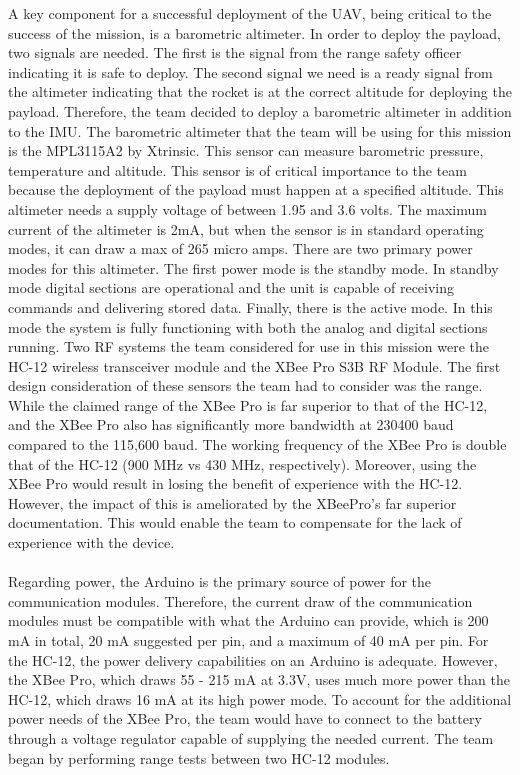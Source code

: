 A key component for a successful deployment of the UAV, being critical to the success of the mission, is a barometric altimeter. In order to deploy the payload, two signals are needed. The first is the signal from the range safety officer indicating it is safe to deploy. The second signal we need is a ready signal from the altimeter indicating that the rocket is at the correct altitude for deploying the payload. Therefore, the team decided to deploy a barometric altimeter in addition to the IMU. 
	The barometric altimeter that the team will be using for this mission is the MPL3115A2  by Xtrinsic. This sensor can measure barometric pressure, temperature and altitude. This sensor is of critical importance to the team because the deployment of the payload must happen at a specified altitude. This altimeter needs a supply voltage of between 1.95 and 3.6 volts. The maximum current of the altimeter is 2mA, but  when the sensor is in standard operating modes, it can draw a max of 265 micro amps. There are two primary power modes for this altimeter. The first power mode is the standby mode. In standby mode digital sections are operational and the unit is capable of receiving commands and delivering stored data. Finally, there is the active mode. In this mode the system is fully functioning with both the analog and digital sections running. 
Two RF systems the team considered for use in this mission were the HC-12 wireless transceiver module and the XBee Pro S3B RF Module. The first design consideration of these sensors the team had to consider was the range. While the claimed range of the XBee Pro is far superior to that of the HC-12, and the XBee Pro also has significantly more bandwidth at 230400 baud compared to the 115,600 baud. The working frequency of the XBee Pro is double that of the HC-12 (900 MHz vs 430 MHz, respectively). Moreover, using the XBee Pro  would result in losing the benefit of experience with the HC-12. However, the impact of this is ameliorated by the XBeePro’s far superior documentation. This would enable the team to  compensate for the lack of experience with the device. 
\\\\
Regarding power, the Arduino is the primary source of power for the communication modules. Therefore, the current draw of the communication modules must be compatible with what the Arduino can provide, which is 200 mA in total, 20 mA suggested per pin, and a maximum of 40 mA per pin. For the HC-12, the power delivery capabilities on an Arduino is adequate. However, the XBee Pro, which draws 55 - 215 mA at 3.3V, uses much more power than the HC-12, which draws 16 mA at its high power mode. To account for the additional power needs of the XBee Pro, the team would have to connect to the battery through a voltage regulator capable of supplying the needed current. The team began by performing range tests between two HC-12 modules. 
